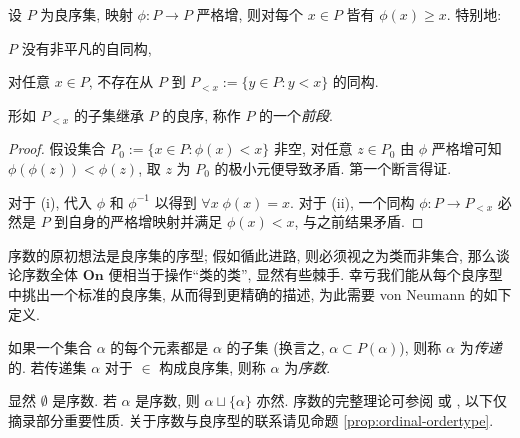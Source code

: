\begin{lemma}\label{prop:wellorder-automorphism}
	设 $P$ 为良序集, 映射 $\phi: P \to P$ 严格增, 则对每个 $x \in P$ 皆有 $\phi(x) \geq x$. 特别地:
	\begin{inparaenum}[(i)]
		\item $P$ 没有非平凡的自同构,
		\item 对任意 $x \in P$, 不存在从 $P$ 到 $P_{< x} := \{y \in P : y < x \}$ 的同构.
	\end{inparaenum}
\end{lemma}
形如 $P_{< x}$ 的子集继承 $P$ 的良序, 称作 $P$ 的一个\emph{前段}.
\begin{proof}
	假设集合 $P_0 := \{x \in P : \phi(x) < x \}$ 非空, 对任意 $z \in P_0$ 由 $\phi$ 严格增可知 $\phi(\phi(z)) < \phi(z)$, 取 $z$ 为 $P_0$ 的极小元便导致矛盾. 第一个断言得证.

	对于 (i), 代入 $\phi$ 和 $\phi^{-1}$ 以得到 $\forall x \; \phi(x)=x$. 对于 (ii), 一个同构 $\phi: P \to P_{< x}$ 必然是 $P$ 到自身的严格增映射并满足 $\phi(x) < x$, 与之前结果矛盾.
\end{proof}

序数的原初想法是良序集的序型; 假如循此进路, 则必须视之为类而非集合, 那么谈论序数全体 $\textbf{On}$ 便相当于操作``类的类'', 显然有些棘手. 幸亏我们能从每个良序型中挑出一个标准的良序集, 从而得到更精确的描述, 为此需要 von Neumann 的如下定义.
\begin{definition}\label{def:ordinal}
	如果一个集合 $\alpha$ 的每个元素都是 $\alpha$ 的子集 (换言之, $\alpha \subset P(\alpha)$), 则称 $\alpha$ 为\emph{传递}的. 若传递集 $\alpha$ 对于 $\in$ 构成良序集, 则称 $\alpha$ 为\emph{序数}.
\end{definition}

显然 $\emptyset$ 是序数. 若 $\alpha$ 是序数, 则 $\alpha \sqcup \{\alpha\}$ 亦然. 序数的完整理论可参阅 \cite[\S 2]{Je03} 或 \cite[第四章]{HY14}, 以下仅摘录部分重要性质. 关于序数与良序型的联系请见命题 \ref{prop:ordinal-ordertype}.

